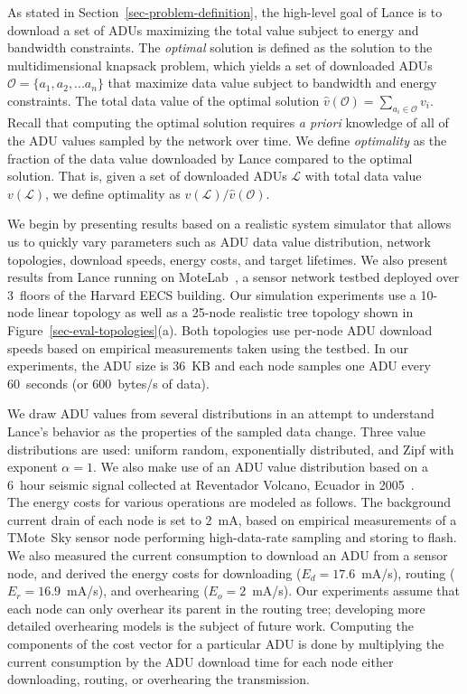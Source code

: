 \documentclass[lettersize]{sig-alternate-konrad}
\begin{document}
As stated in Section~\ref{sec-problem-definition}, the high-level goal of
Lance is to download a set of ADUs maximizing the total value subject to
energy and bandwidth constraints. The {\em optimal} solution is
defined as the solution to the multidimensional knapsack problem,
which yields a set of downloaded ADUs $\mathcal{O} = \{a_1, a_2, ...
a_n\}$ that maximize data value subject to bandwidth and energy
constraints. The total data value of the optimal solution 
$\hat{v}(\mathcal{O}) = \sum_{a_i \in \mathcal{O}} v_i$.
Recall that computing the optimal solution requires {\em a priori} 
knowledge of all of the ADU values sampled by the network over time.
We define {\em optimality} as the fraction of the data value 
downloaded by Lance compared to the optimal solution. That is, given
a set of downloaded ADUs $\mathcal{L}$ with total data value
$v(\mathcal{L})$, we define optimality as 
$v(\mathcal{L}) / \hat{v}(\mathcal{O})$.

We begin by presenting results based on a realistic system
simulator that allows us to quickly vary parameters such as 
ADU data value distribution, network topologies, download speeds,
energy costs, and target lifetimes. We also present results from 
Lance running on MoteLab~\cite{motelab}, a sensor network testbed
deployed over 3~floors of the Harvard EECS building.
Our simulation experiments use
a 10-node linear topology as well as a 25-node realistic tree topology
shown in Figure~\ref{sec-eval-topologies}(a). Both
topologies use per-node ADU download speeds based on empirical 
measurements taken using the testbed. 
In our experiments, the ADU size is 36~KB and each node samples one 
ADU every 60~seconds (or 600~bytes/s of data).

We draw ADU values from several distributions in an attempt to understand
Lance's behavior as the properties of the sampled data change.  Three value
distributions are used: uniform random, exponentially distributed, and Zipf
with exponent $\alpha = 1$.  We also make use of an ADU value distribution
based on a 6~hour seismic signal collected at Reventador Volcano, Ecuador in
2005~\cite{volcano-osdi06}.\\

The energy costs for various operations are modeled as follows.  The
background current drain of each node is set to 2~mA, based on empirical
measurements of a TMote~Sky sensor node performing high-data-rate sampling
and storing to flash.  We also measured the current consumption to download
an ADU from a sensor node, and derived the energy costs for downloading ($E_d
= 17.6$~mA/s), routing ($E_r = 16.9$~mA/s), and overhearing ($E_o = 2$~mA/s).
Our experiments assume that each node can only overhear its parent in the
routing tree; developing more detailed overhearing models is the subject of
future work.  Computing the components of the cost vector for a particular
ADU is done by multiplying the current consumption by the ADU download time
for each node either downloading, routing, or overhearing the transmission.
\end{document}
